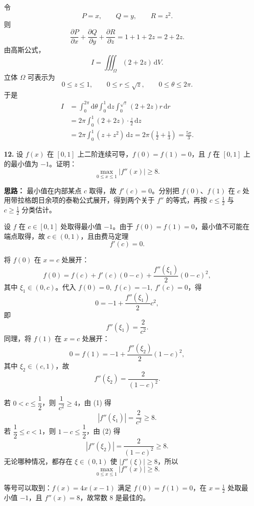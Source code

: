 令
\[
P=x,\qquad Q=y,\qquad R=z^2.
\]
则
\[
\frac{\partial P}{\partial x}+\frac{\partial Q}{\partial y}+\frac{\partial R}{\partial z}
=1+1+2z=2+2z.
\]
由高斯公式，
\[
I=\iiint_{\Omega}(2+2z)\,\mathrm{d}V.
\]
立体 $\Omega$ 可表示为
\[
0\le z\le1,\qquad 0\le r\le\sqrt z,\qquad 0\le\theta\le2\pi.
\]
于是
\[
\begin{aligned}
I&=\int_0^{2\pi}\mathrm{d}\theta\int_0^1\mathrm{d}z\int_0^{\sqrt z}(2+2z)r\,\mathrm{d}r\\
&=2\pi\int_0^1(2+2z)\cdot\frac{z}{2}\,\mathrm{d}z\\
&=2\pi\int_0^1(z+z^2)\,\mathrm{d}z
=2\pi\left(\frac12+\frac13\right)
=\frac{5\pi}{3}.
\end{aligned}
\]
\else \answerarea[10] \fi%

\textbf{12.} 设 $f(x)$ 在 $[0,1]$ 上二阶连续可导，$f(0)=f(1)=0$，且 $f$ 在 $[0,1]$ 上的最小值为 $-1$。证明：
\[
\max_{0\le x\le1}|f''(x)|\ge 8.
\]

\ifshowsolutions%

\textbf{思路：} 最小值在内部某点 $c$ 取得，故 $f'(c)=0$。分别把 $f(0)$、$f(1)$ 在 $c$ 处用带拉格朗日余项的泰勒公式展开，得到两个关于 $f''$ 的等式，再按 $c\le\frac12$ 与 $c\ge\frac12$ 分类估计。

设 $f$ 在 $c\in[0,1]$ 处取得最小值 $-1$。由于 $f(0)=f(1)=0$，最小值不可能在端点取得，故 $c\in(0,1)$，且由费马定理
\[
f'(c)=0.
\]

将 $f(0)$ 在 $x=c$ 处展开：
\[
f(0)=f(c)+f'(c)(0-c)+\frac{f''(\xi_1)}{2}(0-c)^2,
\]
其中 $\xi_1\in(0,c)$。代入 $f(0)=0,\ f(c)=-1,\ f'(c)=0$，得
\[
0=-1+\frac{f''(\xi_1)}{2}c^2,
\]
即
\[
f''(\xi_1)=\frac{2}{c^2}. \tag{1}
\]
同理，将 $f(1)$ 在 $x=c$ 处展开：
\[
0=f(1)=-1+\frac{f''(\xi_2)}{2}(1-c)^2,
\]
其中 $\xi_2\in(c,1)$，故
\[
f''(\xi_2)=\frac{2}{(1-c)^2}. \tag{2}
\]

若 $0<c\le\dfrac12$，则 $\dfrac1{c^2}\ge4$，由 (1) 得
\[
|f''(\xi_1)|=\frac{2}{c^2}\ge8.
\]
若 $\dfrac12\le c<1$，则 $1-c\le\dfrac12$，由 (2) 得
\[
|f''(\xi_2)|=\frac{2}{(1-c)^2}\ge8.
\]
无论哪种情况，都存在 $\xi\in(0,1)$ 使 $|f''(\xi)|\ge8$，所以
\[
\max_{0\le x\le1}|f''(x)|\ge8.
\]

等号可以取到：$f(x)=4x(x-1)$ 满足 $f(0)=f(1)=0$，在 $x=\frac12$ 处取最小值 $-1$，且 $f''(x)=8$，故常数 $8$ 是最佳的。
\else \answerarea[10] \fi%
